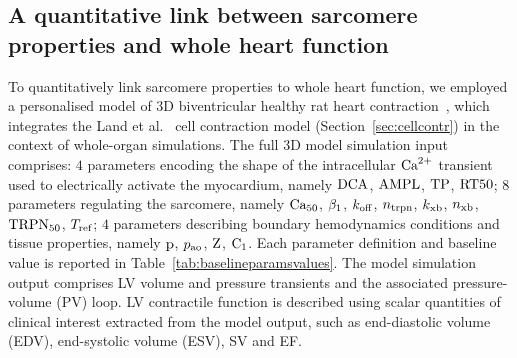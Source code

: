 \subsection{A quantitative link between sarcomere properties and whole heart function}\label{subsec:quantlink}
To quantitatively link sarcomere properties to whole heart function, we employed a personalised model of $3$D biventricular healthy rat heart contraction~\cite{Longobardi:2020}, which integrates the Land et al.~\cite{Land:2012} cell contraction model (Section~\ref{sec:cellcontr}) in the context of whole-organ simulations. The full $3$D model simulation input comprises: $4$ parameters encoding the shape of the intracellular $\textrm{Ca}^{2+}$ transient used to electrically activate the myocardium, namely $\textrm{DCA}$, $\textrm{AMPL}$, $\textrm{TP}$, $\textrm{RT50}$; $8$ parameters regulating the sarcomere, namely $\textrm{Ca}_{50}$, $\beta_1$, $k_{\textrm{off}}$, $n_{\textrm{trpn}}$, $k_{\textrm{xb}}$, $n_{\textrm{xb}}$, $\textrm{TRPN}_{50}$, $T_{\textrm{ref}}$; $4$ parameters describing boundary hemodynamics conditions and tissue properties, namely $\textrm{p}$, $p_{\textrm{ao}}$, $\textrm{Z}$, $\textrm{C}_1$. Each parameter definition and baseline value is reported in Table~\ref{tab:baselineparamsvalues}. The model simulation output comprises LV volume and pressure transients and the associated pressure-volume (PV) loop. LV contractile function is described using scalar quantities of clinical interest extracted from the model output, such as end-diastolic volume (EDV), end-systolic volume (ESV), SV and EF.

